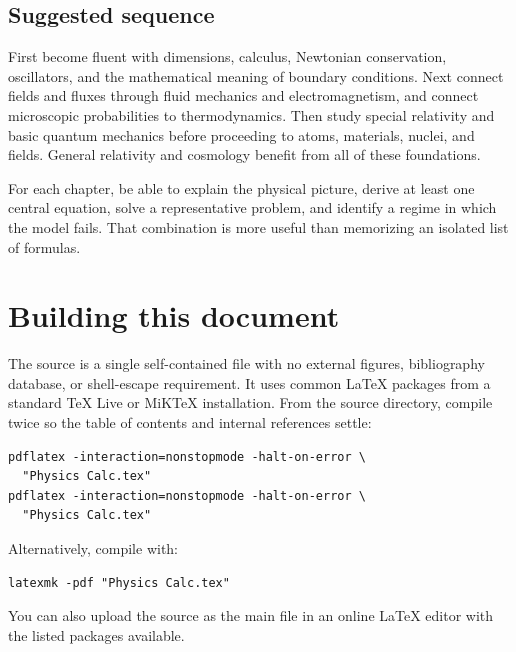 \documentclass[11pt,oneside]{book}
\theoremstyle{reviewstyle}
\begin{document}
\section*{Suggested sequence}
First become fluent with dimensions, calculus, Newtonian conservation, oscillators, and the mathematical meaning of boundary conditions. Next connect fields and fluxes through fluid mechanics and electromagnetism, and connect microscopic probabilities to thermodynamics. Then study special relativity and basic quantum mechanics before proceeding to atoms, materials, nuclei, and fields. General relativity and cosmology benefit from all of these foundations.

For each chapter, be able to explain the physical picture, derive at least one central equation, solve a representative problem, and identify a regime in which the model fails. That combination is more useful than memorizing an isolated list of formulas.
\backmatter
\chapter*{Building this document}
The source is a single self-contained file with no external figures, bibliography database, or shell-escape requirement. It uses common LaTeX packages from a standard TeX Live or MiKTeX installation. From the source directory, compile twice so the table of contents and internal references settle:
\begin{verbatim}
pdflatex -interaction=nonstopmode -halt-on-error \
  "Physics Calc.tex"
pdflatex -interaction=nonstopmode -halt-on-error \
  "Physics Calc.tex"
\end{verbatim}
Alternatively, compile with:
\begin{verbatim}
latexmk -pdf "Physics Calc.tex"
\end{verbatim}
You can also upload the source as the main file in an online LaTeX editor with the listed packages available.
\end{document}
